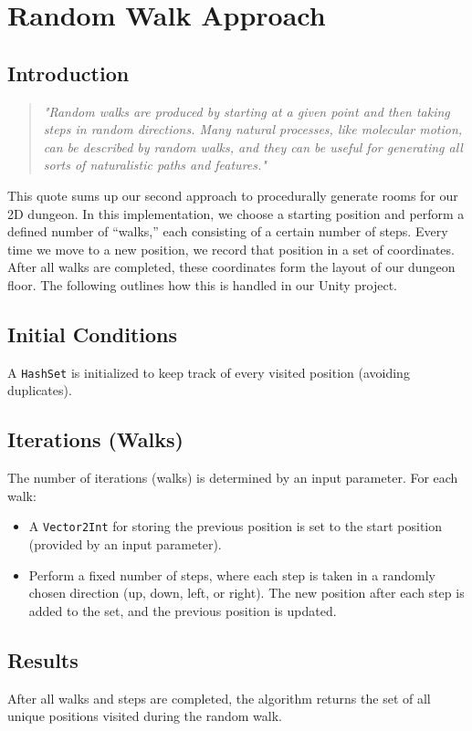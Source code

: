\documentclass[a4paper, 12pt, one column, aas_macros]{article}
\begin{document}
\section{Random Walk Approach}
\subsection{Introduction}
\begin{quote}
  \emph{"Random walks are produced by starting at a given point and then taking steps in random directions. Many natural processes, like molecular  motion, can be described by random walks, and they can be useful for  generating all sorts of naturalistic paths and features."}
  \cite[p.~286]{ShortAdams2017}
\end{quote}

This quote sums up our second approach to procedurally generate rooms for our 2D dungeon. In this implementation, we choose a starting position and perform a defined number of ``walks,'' each consisting of a certain number of steps. Every time we move to a new position, we record that position in a set of coordinates. After all walks are completed, these coordinates form the layout of our dungeon floor. The following outlines how this is handled in our Unity project.

\subsection{Initial Conditions}
A \texttt{HashSet} is initialized to keep track of every visited position (avoiding duplicates).

\subsection{Iterations (Walks)}
The number of iterations (walks) is determined by an input parameter. For each walk:
\begin{itemize}
  \item A \texttt{Vector2Int} for storing the previous position is set to the start position (provided by an input parameter).
  \item Perform a fixed number of steps, where each step is taken in a randomly chosen direction (up, down, left, or right). The new position after each step is added to the set, and the previous position is updated.  
\end{itemize}

\subsection{Results}
After all walks and steps are completed, the algorithm returns the set of all unique positions visited during the random walk.
\end{document}
